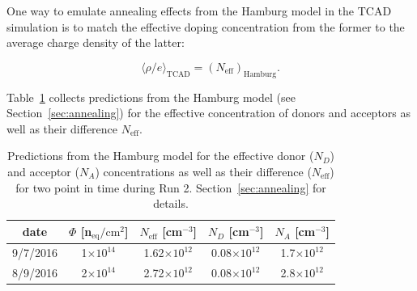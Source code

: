 One way to emulate annealing effects from the Hamburg model in the TCAD simulation is to match the effective doping concentration from the former to the average charge density of the latter: 

\begin{equation}
\langle \rho/e\rangle_\text{TCAD}=(N_\text{eff})_\text{Hamburg}.
\label{eq:SpaceChargeTCADHamburg}
\end{equation}

Table~\ref{tab:NeffHamburg} collects predictions from the Hamburg model (see Section~\ref{sec:annealing}) for the effective concentration of donors and acceptors as well as their difference $N_\text{eff}$. 

\begin{table}[!htpb]
\centering
\begin{tabular}{ccccc}
  \hline
   date & $\Phi$ [n$_\text{eq}/\text{cm}^{2}$] & $N_\text{eff}$ [cm$^{-3}$] 
   & $N_D$ [cm$^{-3}$]	& $N_A$ [cm$^{-3}$]	\\
   \hline
   \hline	
  9/7/2016 & 1$\times10^{14}$ & 1.62$\times10^{12}$ & 0.08$\times10^{12}$ & 1.7$\times10^{12}$ \\
 8/9/2016 & 2$\times10^{14}$ & 2.72$\times10^{12}$ & 0.08$\times10^{12}$ & 2.8$\times10^{12}$\\
  \hline  
\end{tabular}
\caption{\label{tab:NeffHamburg}Predictions from the Hamburg model for the effective donor ($N_D$) and acceptor ($N_A$) concentrations as well as their difference ($N_\text{eff}$) for two point in time during Run 2.  Section~\ref{sec:annealing} for details.}
\end{table}

